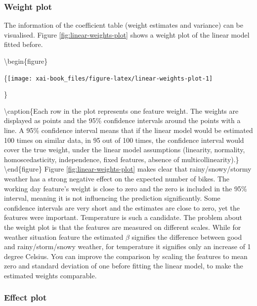 \documentclass[12pt,]{krantz}
\theoremstyle{definition}
\theoremstyle{definition}
\theoremstyle{definition}
\theoremstyle{remark}
\begin{document}
\subsubsection{Weight plot}\label{weight-plot}

The information of the coefficient table (weight estimates and variance)
can be visualised. Figure \ref{fig:linear-weights-plot} shows a weight
plot of the linear model fitted before.

\textbackslash{}begin\{figure\}

\{\centering \texttt{[image: xai-book\_files/figure-latex/linear-weights-plot-1]}

\}

\textbackslash{}caption\{Each row in the plot represents one feature
weight. The weights are displayed as points and the 95\% confidence
intervals around the points with a line. A 95\% confidence interval
means that if the linear model would be estimated 100 times on similar
data, in 95 out of 100 times, the confidence interval would cover the
true weight, under the linear model assumptions (linearity, normality,
homoscedasticity, independence, fixed features, absence of
multicollinearity).\}\label{fig:linear-weights-plot}
\textbackslash{}end\{figure\} Figure \ref{fig:linear-weights-plot} makes
clear that rainy/snowy/stormy weather has a strong negative effect on
the expected number of bikes. The working day feature's weight is close
to zero and the zero is included in the 95\% interval, meaning it is not
influencing the prediction significantly. Some confidence intervals are
very short and the estimates are close to zero, yet the features were
important. Temperature is such a candidate. The problem about the weight
plot is that the features are measured on different scales. While for
weather situation feature the estimated \(\beta\) signifies the
difference between good and rainy/storm/snowy weather, for temperature
it signifies only an increase of 1 degree Celsius. You can improve the
comparison by scaling the features to mean zero and standard deviation
of one before fitting the linear model, to make the estimated weights
comparable.

\subsubsection{Effect plot}\label{effect-plot}
\end{document}
